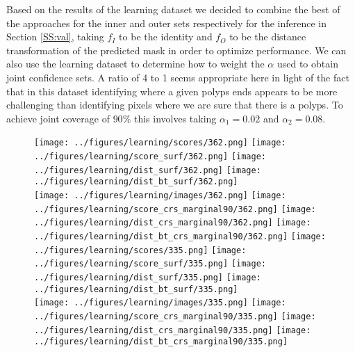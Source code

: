 Based on the results of the learning dataset we decided to combine the best of the approaches for the inner and outer sets respectively for the inference in Section \ref{SS:val}, taking $f_I$ to be the identity and $f_O$ to be the distance transformation of the predicted mask in order to optimize performance. We can also use the learning dataset to determine how to weight the $\alpha$ used to obtain joint confidence sets. A ratio of 4 to 1 seems appropriate here in light of the fact that in this dataset identifying where a given polyps ends appears to be more challenging than identifying pixels where we are sure that there is a polyps. To achieve joint coverage of $90\%$ this involves taking $\alpha_1 = 0.02$ and $\alpha_2 = 0.08$.
\begin{figure}[h!]
\begin{center}
	\texttt{[image: ../figures/learning/scores/362.png]}
		\texttt{[image: ../figures/learning/score\_surf/362.png]}	\texttt{[image: ../figures/learning/dist\_surf/362.png]}
		\texttt{[image: ../figures/learning/dist\_bt\_surf/362.png]}\\
		\texttt{[image: ../figures/learning/images/362.png]}
	\texttt{[image: ../figures/learning/score\_crs\_marginal90/362.png]}
	\texttt{[image: ../figures/learning/dist\_crs\_marginal90/362.png]}
	\texttt{[image: ../figures/learning/dist\_bt\_crs\_marginal90/362.png]}
		\texttt{[image: ../figures/learning/scores/335.png]}
	\texttt{[image: ../figures/learning/score\_surf/335.png]}	\texttt{[image: ../figures/learning/dist\_surf/335.png]}
	\texttt{[image: ../figures/learning/dist\_bt\_surf/335.png]}\\
	\texttt{[image: ../figures/learning/images/335.png]}
	\texttt{[image: ../figures/learning/score\_crs\_marginal90/335.png]}
	\texttt{[image: ../figures/learning/dist\_crs\_marginal90/335.png]}
	\texttt{[image: ../figures/learning/dist\_bt\_crs\_marginal90/335.png]}
\end{center}

\end{figure}

